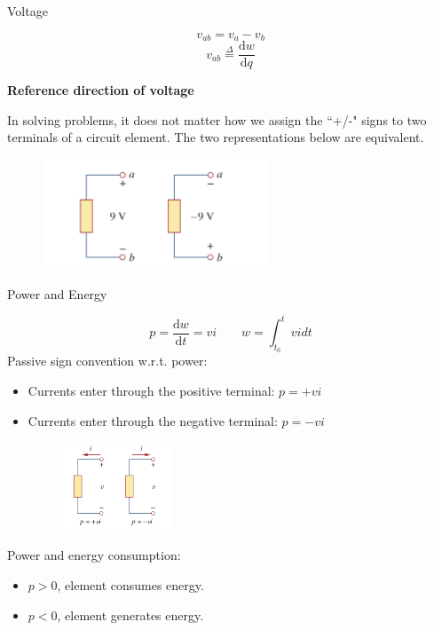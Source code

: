 \documentclass{beamer}
\begin{document}
\begin{frame}{Voltage}

$$ v_{ab} = v_a - v_b$$
$$ v_{ab} \overset{\Delta}{=} \dfrac{\mathrm{d}w}{\mathrm{d}q}$$

\textbf{Reference direction of voltage}

In solving problems, it does not matter how we assign the ``+/-" signs to two terminals of a circuit element. The two representations below are equivalent.



\begin{figure}
\centering
\includegraphics[width=0.6\textwidth]{voltage2.png}
\end{figure}
\end{frame}


\begin{frame}{Power and Energy}

$$p = \dfrac{\mathrm{d}w}{\mathrm{d}t} = vi \qquad w = \int_{t_0}^{t}vidt$$
Passive sign convention w.r.t. power:
\begin{itemize}
    \item Currents enter through the positive terminal: $p=+vi$
    \item Currents enter through the negative terminal: $p=-vi$

    \begin{figure}
    \includegraphics[width=0.3\textwidth]{power sign.png}
    \end{figure}
\end{itemize}
Power and energy consumption:
\begin{itemize}
    \item $p>0$, element consumes energy.
    \item $p<0$, element generates energy.
\end{itemize}

\end{frame}
\end{document}
